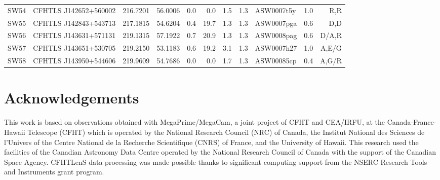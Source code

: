 \documentclass[useAMS,usenatbib,a4paper]{mn2e}
\begin{document}
\begin{center}
\begin{longtable}{llrrrrrrlrr}
SW54 & CFHTLS J142652+560002 &  216.7201 &   56.0006 &  0.0 &  0.0 &  1.5 &  1.3 & ASW0007t5y &  1.0  &  R,R   \\
SW55 & CFHTLS J142843+543713 &  217.1815 &   54.6204 &  0.4 & 19.7 &  1.3 &  1.3 & ASW0007pga &  0.6  &  D,D   \\
SW56 & CFHTLS J143631+571131 &  219.1315 &   57.1922 &  0.7 & 20.9 &  1.3 &  1.3 & ASW0008pag &  0.6  &  D/A,R   \\
SW57 & CFHTLS J143651+530705 &  219.2150 &   53.1183 &  0.6 & 19.2 &  3.1 &  1.3 & ASW0007h27 &  1.0  &  A,E/G   \\
SW58 & CFHTLS J143950+544606 &  219.9609 &   54.7686 &  0.0 &  0.0 &  1.7 &  1.3 & ASW00085cp &  0.4  &  A,G/R   \\

\end{longtable}
\end{center}

\twocolumn
\section*{Acknowledgements}


This work is based on observations obtained with MegaPrime/MegaCam, a joint
project of CFHT and CEA/IRFU, at the Canada-France-Hawaii Telescope (CFHT) which
is operated by the National Research Council (NRC) of Canada, the Institut
National des Sciences de l'Univers of the Centre National de la Recherche
Scientifique (CNRS) of France, and the University of Hawaii. This research used
the facilities of the Canadian Astronomy Data Centre operated by the National
Research Council of Canada with the support of the Canadian Space Agency.
CFHTLenS data processing was made possible thanks to significant computing
support from the NSERC Research Tools and Instruments grant program.
\end{document}

